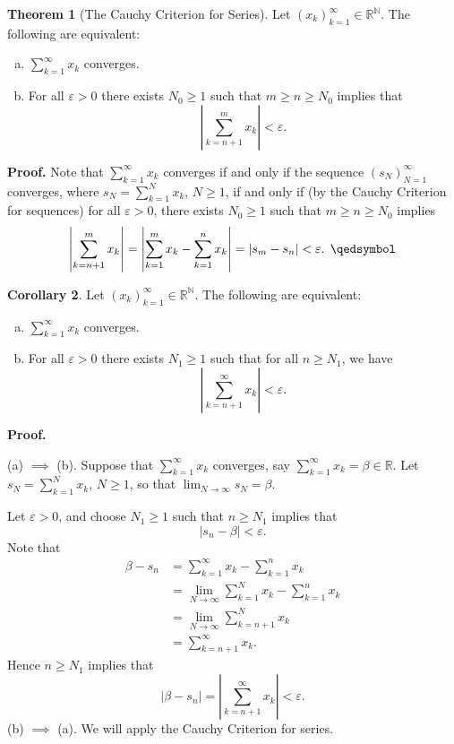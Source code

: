 \documentclass[11pt]{article}
\theoremstyle{definition}
\newtheorem{thm}{Theorem}[section]
\newtheorem{cor}[thm]{Corollary}
\newcommand{\mbN}{\ensuremath{\mathbb{N}}}
\newcommand{\mbR}{\ensuremath{\mathbb{R}}}
\begin{document}
\begin{thm}[The Cauchy Criterion for Series]
Let $(x_k)_{k=1}^\infty \in \mbR^{\mbN}$. The following are equivalent:
\begin{enumerate}[(a)] \vspace{-0.2cm}
\item $\sum_{k=1}^\infty x_k$ converges.
\item For all $\varepsilon > 0$ there exists $N_0 \geq 1$ such that $m \geq n \geq N_0$ implies that
$$\left| \sum_{k=n+1}^m x_k \right| < \varepsilon \text{.}$$
\end{enumerate}
\end{thm}
\textbf{Proof.}
Note that $\sum_{k=1}^\infty x_k$ converges if and only if the sequence $(s_N)_{N=1}^\infty$ converges, where $s_N = \sum_{k=1}^N x_k$, $N \geq 1$, if and only if (by the Cauchy Criterion for sequences) for all $\varepsilon > 0$, there exists $N_0 \geq 1$ such that $m \geq n \geq N_0$ implies
$$\left| \sum_{k=n+1}^m x_k \right| = \left| \sum_{k=1}^m x_k - \sum_{k=1}^n x_k\right| = |s_m - s_n| < \varepsilon \text{. } \qedsymbol$$

\begin{cor}
Let $(x_k)_{k=1}^\infty \in \mbR^{\mbN}$. The following are equivalent:
\begin{enumerate}[(a)] \vspace{-0.2cm}
\item $\sum_{k=1}^\infty x_k$ converges.
\item For all $\varepsilon > 0$ there exists $N_1 \geq 1$ such that for all $n \geq N_1$, we have
$$\left| \sum_{k=n+1}^\infty x_k \right| < \varepsilon \text{.}$$
\end{enumerate}
\end{cor}
\textbf{Proof.}

(a) $\implies$ (b). Suppose that $\sum_{k=1}^\infty x_k$ converges, say $\sum_{k=1}^\infty x_k = \beta \in \mbR$. Let $s_N = \sum_{k=1}^N x_k$, $N \geq 1$, so that $\lim_{N\to\infty} s_N = \beta$.

Let $\varepsilon > 0$, and choose $N_1 \geq 1$ such that $n \geq N_1$ implies that
$$|s_n - \beta| < \varepsilon \text{.}$$
Note that 
\begin{align*}
\beta - s_n & = \sum_{k=1}^\infty x_k - \sum_{k=1}^n x_k \\
& = \lim_{N\to\infty} \sum_{k=1}^N x_k - \sum_{k=1}^n x_k \\
& = \lim_{N\to\infty} \sum_{k=n+1}^N x_k \\
& = \sum_{k=n+1}^\infty x_k \text{.}
\end{align*}
Hence $n \geq N_1$ implies that
$$|\beta - s_n| = \left|\sum_{k=n+1}^\infty x_k\right| < \varepsilon \text{.}$$
(b) $\implies$ (a). We will apply the Cauchy Criterion for series.
\end{document}

